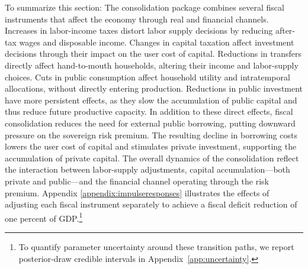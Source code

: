 \documentclass[12pt]{article}
\begin{document}

To summarize this section: The consolidation package combines several fiscal instruments that affect the economy through real and financial channels. Increases in labor-income taxes distort labor supply decisions by reducing after-tax wages and disposable income. Changes in capital taxation affect investment decisions through their impact on the user cost of capital. Reductions in transfers directly affect hand-to-mouth households, altering their income and labor-supply choices. Cuts in public consumption affect household utility and intratemporal allocations, without directly entering production. Reductions in public investment have more persistent effects, as they slow the accumulation of public capital and thus reduce future productive capacity. In addition to these direct effects, fiscal consolidation reduces the need for external public borrowing, putting downward pressure on the sovereign risk premium. The resulting decline in borrowing costs lowers the user cost of capital and stimulates private investment, supporting the accumulation of private capital. The overall dynamics of the consolidation reflect the interaction between labor-supply adjustments, capital accumulation—both private and public—and the financial channel operating through the risk premium. Appendix \ref{appendix:impulseresponses} illustrates the effects of adjusting each fiscal instrument separately to achieve a fiscal deficit reduction of one percent of GDP.\footnote{To quantify parameter uncertainty around these transition paths, we report posterior‑draw credible intervals in Appendix~\ref{app:uncertainty}.}
\end{document}
